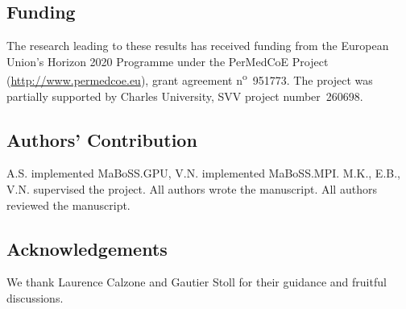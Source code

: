 \documentclass[sn-mathphys-num]{sn-jnl}%
\begin{document}
\subsection*{Funding}
The research leading to these results has received funding from the European Union's Horizon 2020 Programme under the PerMedCoE Project (\url{http://www.permedcoe.eu}), grant agreement n\textsuperscript{o}~951773.
The project was partially supported by Charles University, SVV project number~260698.

\subsection*{Authors' Contribution}
A.S. implemented MaBoSS.GPU, V.N. implemented MaBoSS.MPI. M.K., E.B., V.N. supervised the project. All authors wrote the manuscript. All authors reviewed the manuscript.

\subsection*{Acknowledgements}
We thank Laurence Calzone and Gautier Stoll for their guidance and fruitful discussions.








\end{document}
